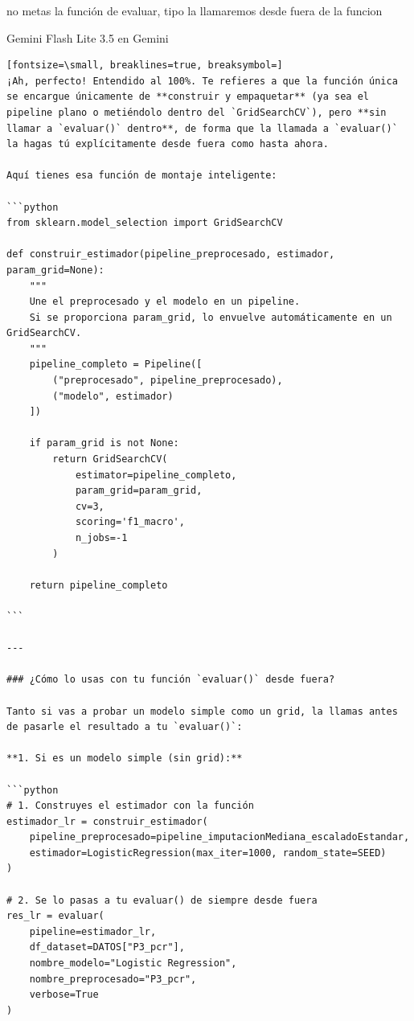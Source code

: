 \documentclass[12pt,a4paper,oneside]{book}
\begin{document}
\begin{iaprompt}
no metas la función de evaluar, tipo la llamaremos desde fuera de la funcion
\end{iaprompt}
\begin{iaresp}{Gemini Flash Lite 3.5 en Gemini}
\begin{Verbatim}[fontsize=\small, breaklines=true, breaksymbol=]
¡Ah, perfecto! Entendido al 100%. Te refieres a que la función única se encargue únicamente de **construir y empaquetar** (ya sea el pipeline plano o metiéndolo dentro del `GridSearchCV`), pero **sin llamar a `evaluar()` dentro**, de forma que la llamada a `evaluar()` la hagas tú explícitamente desde fuera como hasta ahora.

Aquí tienes esa función de montaje inteligente:

```python
from sklearn.model_selection import GridSearchCV

def construir_estimador(pipeline_preprocesado, estimador, param_grid=None):
    """
    Une el preprocesado y el modelo en un pipeline. 
    Si se proporciona param_grid, lo envuelve automáticamente en un GridSearchCV.
    """
    pipeline_completo = Pipeline([
        ("preprocesado", pipeline_preprocesado),
        ("modelo", estimador)
    ])
    
    if param_grid is not None:
        return GridSearchCV(
            estimator=pipeline_completo,
            param_grid=param_grid,
            cv=3,
            scoring='f1_macro',
            n_jobs=-1
        )
    
    return pipeline_completo

```

---

### ¿Cómo lo usas con tu función `evaluar()` desde fuera?

Tanto si vas a probar un modelo simple como un grid, la llamas antes de pasarle el resultado a tu `evaluar()`:

**1. Si es un modelo simple (sin grid):**

```python
# 1. Construyes el estimador con la función
estimador_lr = construir_estimador(
    pipeline_preprocesado=pipeline_imputacionMediana_escaladoEstandar,
    estimador=LogisticRegression(max_iter=1000, random_state=SEED)
)

# 2. Se lo pasas a tu evaluar() de siempre desde fuera
res_lr = evaluar(
    pipeline=estimador_lr, 
    df_dataset=DATOS["P3_pcr"], 
    nombre_modelo="Logistic Regression", 
    nombre_preprocesado="P3_pcr", 
    verbose=True
)


\end{Verbatim}
\end{iaresp}
\end{document}
